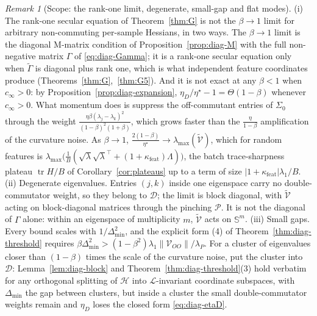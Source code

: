 \documentclass[11pt]{article}
\theoremstyle{remark}
\newtheorem{remark}[theorem]{Remark}
\newcommand{\tr}{\operatorname{tr}}
\begin{document}
\begin{remark}[Scope: the rank-one limit, degenerate, small-gap and flat modes]\label{rem:diag-scope}
(i) The rank-one secular equation of Theorem~\ref{thm:G} is not the $\beta\to1$ limit for arbitrary non-commuting per-sample Hessians, in two ways. The $\beta\to1$ limit is the diagonal M-matrix condition of Proposition~\ref{prop:diag-M} with the full non-negative matrix $\Gamma$ of \eqref{eq:diag-Gamma}; it is a rank-one secular equation only when $\widetilde\Gamma$ is diagonal plus rank one, which is what independent feature coordinates produce (Theorems~\ref{thm:G},~\ref{thm:G5}). And it is not exact at any $\beta<1$ when $c_\infty>0$: by Proposition~\ref{prop:diag-expansion}, $\eta_D/\eta^\star-1=\Theta(1-\beta)$ whenever $c_\infty>0$. What momentum does is suppress the off-commutant entries of $\Sigma_0$ through the weight $\frac{\eta\beta(\lambda_j-\lambda_k)^2}{(1-\beta)^2(1+\beta)}$, which grows faster than the $\frac{\eta}{1-\beta}$ amplification of the curvature noise. As $\beta\to1$, $\frac{2(1-\beta)}{\eta^\star}\to\lambda_{\max}(\widetilde{\mathcal V})$, which for random features is $\lambda_{\max}\big(\frac1B(\sqrt\lambda\sqrt\lambda^\top+(1+\kappa_{\mathrm{feat}})\Lambda)\big)$, the batch trace-sharpness plateau $\tr H/B$ of Corollary~\ref{cor:plateaus} up to a term of size $|1+\kappa_{\mathrm{feat}}|\lambda_1/B$.
(ii) Degenerate eigenvalues. Entries $(j,k)$ inside one eigenspace carry no double-commutator weight, so they belong to $\mathcal D$; the limit is block diagonal, with $\widetilde{\mathcal V}$ acting on block-diagonal matrices through the pinching $\mathcal P$. It is not the diagonal of $\Gamma$ alone: within an eigenspace of multiplicity $m$, $\widetilde{\mathcal V}$ acts on $\mathbb S^m$.
(iii) Small gaps. Every bound scales with $1/\Delta_{\min}^2$, and the explicit form (4) of Theorem~\ref{thm:diag-threshold} requires $\beta\Delta_{\min}^2>(1-\beta^2)\lambda_1\|\mathcal V_{OO}\|/\lambda_P$. For a cluster of eigenvalues closer than $(1-\beta)$ times the scale of the curvature noise, put the cluster into $\mathcal D$: Lemma~\ref{lem:diag-block} and Theorem~\ref{thm:diag-threshold}(3) hold verbatim for any orthogonal splitting of $\mathcal H$ into $\mathcal L$-invariant coordinate subspaces, with $\Delta_{\min}$ the gap between clusters, but inside a cluster the small double-commutator weights remain and $\eta_D$ loses the closed form \eqref{eq:diag-etaD}.

\end{remark}
\end{document}

